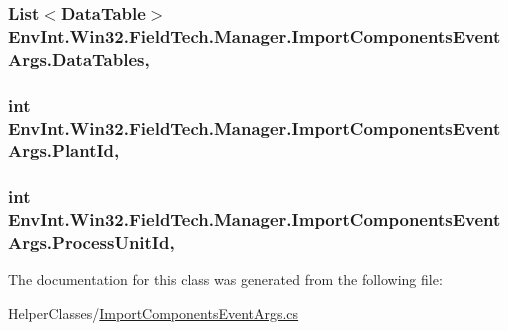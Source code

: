 \subsubsection[{Data\+Tables}]{\setlength{\rightskip}{0pt plus 5cm}List$<$Data\+Table$>$ Env\+Int.\+Win32.\+Field\+Tech.\+Manager.\+Import\+Components\+Event\+Args.\+Data\+Tables\hspace{0.3cm}{\ttfamily [get]}, {\ttfamily [set]}}\label{class_env_int_1_1_win32_1_1_field_tech_1_1_manager_1_1_import_components_event_args_a73ba1960cd8694aa42855ec7742a67e2}
\hypertarget{class_env_int_1_1_win32_1_1_field_tech_1_1_manager_1_1_import_components_event_args_ac80032595215a3d6b4227b8f8ef37cd8}{}
\subsubsection[{Plant\+Id}]{\setlength{\rightskip}{0pt plus 5cm}int Env\+Int.\+Win32.\+Field\+Tech.\+Manager.\+Import\+Components\+Event\+Args.\+Plant\+Id\hspace{0.3cm}{\ttfamily [get]}, {\ttfamily [set]}}\label{class_env_int_1_1_win32_1_1_field_tech_1_1_manager_1_1_import_components_event_args_ac80032595215a3d6b4227b8f8ef37cd8}
\hypertarget{class_env_int_1_1_win32_1_1_field_tech_1_1_manager_1_1_import_components_event_args_a6a48076b57f3fbbc5405fe5df74890ff}{}
\subsubsection[{Process\+Unit\+Id}]{\setlength{\rightskip}{0pt plus 5cm}int Env\+Int.\+Win32.\+Field\+Tech.\+Manager.\+Import\+Components\+Event\+Args.\+Process\+Unit\+Id\hspace{0.3cm}{\ttfamily [get]}, {\ttfamily [set]}}\label{class_env_int_1_1_win32_1_1_field_tech_1_1_manager_1_1_import_components_event_args_a6a48076b57f3fbbc5405fe5df74890ff}


The documentation for this class was generated from the following file\+:\begin{DoxyCompactItemize}
\item 
Helper\+Classes/\hyperlink{_import_components_event_args_8cs}{Import\+Components\+Event\+Args.\+cs}\end{DoxyCompactItemize}
